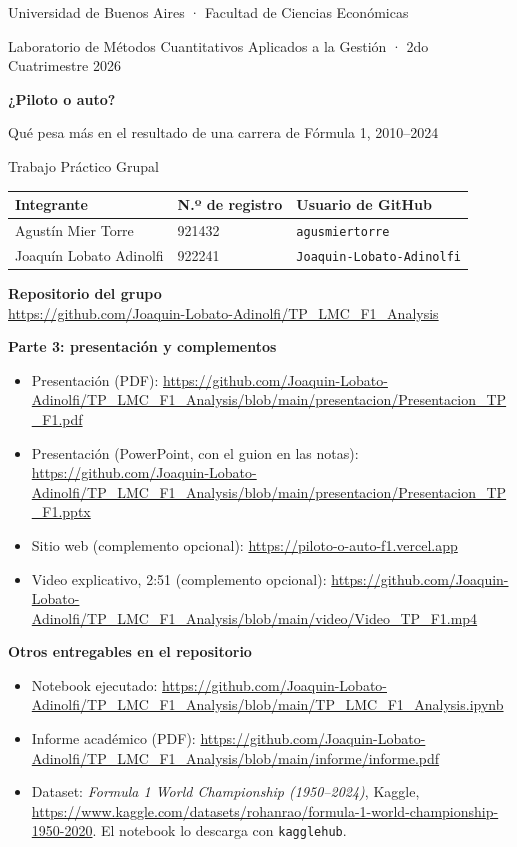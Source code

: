 \documentclass[12pt,a4paper]{article}
\newcommand{\registro}[1]{#1}
\begin{document}
\begin{center}
{\large Universidad de Buenos Aires · Facultad de Ciencias Económicas\par}
{\normalsize Laboratorio de Métodos Cuantitativos Aplicados a la Gestión · 2do Cuatrimestre 2026\par}
\vspace{1.6cm}
{\Huge\bfseries ¿Piloto o auto?\par}
\vspace{0.4cm}
{\Large Qué pesa más en el resultado de una carrera de Fórmula 1, 2010--2024\par}
\vspace{0.3cm}
{\large Trabajo Práctico Grupal\par}
\vspace{1.4cm}
\begin{tabular}{lll}
\toprule
\textbf{Integrante} & \textbf{N.º de registro} & \textbf{Usuario de GitHub} \\
\midrule
Agustín Mier Torre      & \registro{921432} & \texttt{agusmiertorre} \\
Joaquín Lobato Adinolfi & \registro{922241} & \texttt{Joaquin-Lobato-Adinolfi} \\
\bottomrule
\end{tabular}
\end{center}
\vspace{1.2cm}
\noindent\textbf{Repositorio del grupo}\\
\url{https://github.com/Joaquin-Lobato-Adinolfi/TP_LMC_F1_Analysis}

\vspace{0.6cm}
\noindent\textbf{Parte 3: presentación y complementos}
\begin{itemize}
  \item Presentación (PDF): \url{https://github.com/Joaquin-Lobato-Adinolfi/TP_LMC_F1_Analysis/blob/main/presentacion/Presentacion_TP_F1.pdf}
  \item Presentación (PowerPoint, con el guion en las notas): \url{https://github.com/Joaquin-Lobato-Adinolfi/TP_LMC_F1_Analysis/blob/main/presentacion/Presentacion_TP_F1.pptx}
  \item Sitio web (complemento opcional): \url{https://piloto-o-auto-f1.vercel.app}
  \item Video explicativo, 2:51 (complemento opcional): \url{https://github.com/Joaquin-Lobato-Adinolfi/TP_LMC_F1_Analysis/blob/main/video/Video_TP_F1.mp4}
\end{itemize}

\vspace{0.4cm}
\noindent\textbf{Otros entregables en el repositorio}
\begin{itemize}
  \item Notebook ejecutado: \url{https://github.com/Joaquin-Lobato-Adinolfi/TP_LMC_F1_Analysis/blob/main/TP_LMC_F1_Analysis.ipynb}
  \item Informe académico (PDF): \url{https://github.com/Joaquin-Lobato-Adinolfi/TP_LMC_F1_Analysis/blob/main/informe/informe.pdf}
  \item Dataset: \emph{Formula 1 World Championship (1950--2024)}, Kaggle, \url{https://www.kaggle.com/datasets/rohanrao/formula-1-world-championship-1950-2020}. El notebook lo descarga con \texttt{kagglehub}.
\end{itemize}
\end{document}
